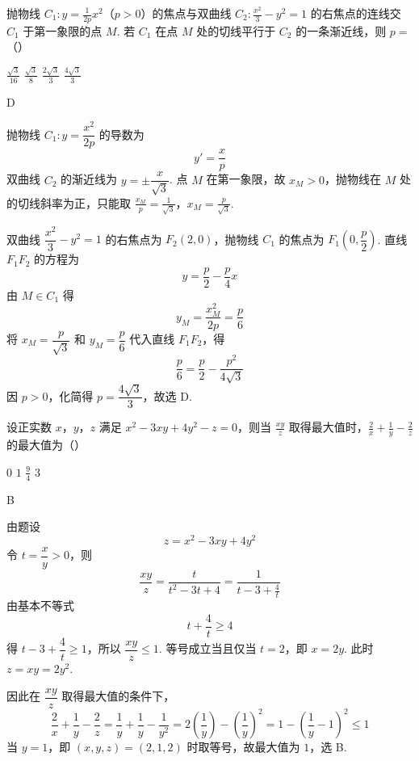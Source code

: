 \begin{problem}
抛物线 \(C_{1}: y = \frac{1}{2p}x^2\)（\(p > 0\)）的焦点与双曲线 \(C_{2}: \frac{x^2}{3} - y^2 = 1\) 的右焦点的连线交 \(C_{1}\) 于第一象限的点 \(M\). 若 \(C_{1}\) 在点 \(M\) 处的切线平行于 \(C_{2}\) 的一条渐近线，则 \(p =\)（\quad）

\choices
    {\(\frac{\sqrt{3}}{16}\)}
    {\(\frac{\sqrt{3}}{8}\)}
    {\(\frac{2\sqrt{3}}{3}\)}
    {\(\frac{4\sqrt{3}}{3}\)}
\end{problem}

\begin{answer}
D
\end{answer}

\begin{solution}
抛物线 \(C_1:y=\dfrac{x^2}{2p}\) 的导数为
\[
y'=\frac{x}{p}
\]
双曲线 \(C_2\) 的渐近线为 \(y=\pm\dfrac{x}{\sqrt{3}}\). 点 \(M\) 在第一象限，故 \(x_M>0\)，抛物线在 \(M\) 处的切线斜率为正，只能取
\(\frac{x_M}{p}=\frac{1}{\sqrt{3}}\)，\(x_M=\frac{p}{\sqrt{3}}\).

双曲线 \(\dfrac{x^2}{3}-y^2=1\) 的右焦点为 \(F_2(2,0)\)，抛物线 \(C_1\) 的焦点为 \(F_1\left(0,\dfrac{p}{2}\right)\). 直线 \(F_1F_2\) 的方程为
\[
y=\frac{p}{2}-\frac{p}{4}x
\]
由 \(M\in C_1\) 得
\[
y_M=\frac{x_M^2}{2p}=\frac{p}{6}
\]
将 \(x_M=\dfrac{p}{\sqrt{3}}\) 和 \(y_M=\dfrac{p}{6}\) 代入直线 \(F_1F_2\)，得
\[
\frac{p}{6}=\frac{p}{2}-\frac{p^2}{4\sqrt{3}}
\]
因 \(p>0\)，化简得 \(p=\dfrac{4\sqrt{3}}{3}\)，故选 D.
\end{solution}

\begin{problem}
设正实数 \(x\)，\(y\)，\(z\) 满足 \(x^2 - 3xy + 4y^2 - z = 0\)，则当 \(\frac{xy}{z}\) 取得最大值时，\(\frac{2}{x} + \frac{1}{y} - \frac{2}{z}\) 的最大值为（\quad）

\choices
    {\(0\)}
    {\(1\)}
    {\(\frac{9}{4}\)}
    {\(3\)}
\end{problem}

\begin{answer}
B
\end{answer}

\begin{solution}
由题设
\[
z=x^2-3xy+4y^2
\]
令 \(t=\dfrac{x}{y}>0\)，则
\[
\frac{xy}{z}=\frac{t}{t^2-3t+4}
=\frac{1}{t-3+\frac{4}{t}}
\]
由基本不等式
\[
t+\frac{4}{t}\geq4
\]
得 \(t-3+\dfrac{4}{t}\geq1\)，所以 \(\dfrac{xy}{z}\leq1\). 等号成立当且仅当 \(t=2\)，即 \(x=2y\). 此时 \(z=xy=2y^2\).

因此在 \(\dfrac{xy}{z}\) 取得最大值的条件下，
\[
\frac{2}{x}+\frac{1}{y}-\frac{2}{z}
=\frac{1}{y}+\frac{1}{y}-\frac{1}{y^2}
=2\left(\frac{1}{y}\right)-\left(\frac{1}{y}\right)^2
=1-\left(\frac{1}{y}-1\right)^2\leq1
\]
当 \(y=1\)，即 \((x,y,z)=(2,1,2)\) 时取等号，故最大值为 \(1\)，选 B.
\end{solution}


